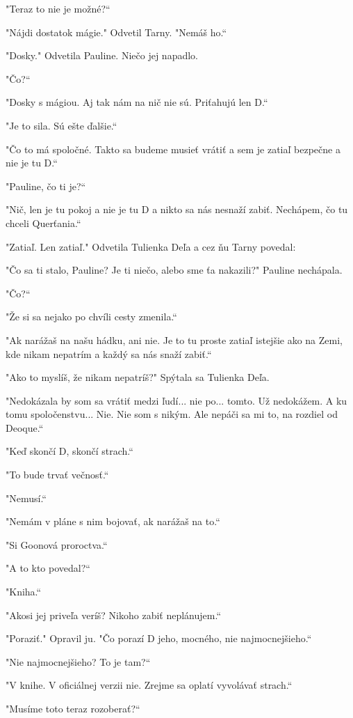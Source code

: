 \documentclass{book}
\begin{document}
"$ $Teraz to nie je možné?“

"$ $Nájdi dostatok mágie."$ $ Odvetil Tarny. "$ $Nemáš ho.“

"$ $Dosky."$ $ Odvetila Pauline. Niečo jej napadlo.

"$ $Čo?“

"$ $Dosky s mágiou. Aj tak nám na nič nie sú. Priťahujú len D.“

"$ $Je to sila. Sú ešte ďalšie.“

"$ $Čo to má spoločné. Takto sa budeme musieť vrátiť a sem je zatiaľ bezpečne a nie je tu D.“

"$ $Pauline, čo ti je?“

"$ $Nič, len je tu pokoj a nie je tu D a nikto sa nás nesnaží zabiť. Nechápem, čo tu chceli Querťania.“

"$ $Zatiaľ. Len zatiaľ."$ $ Odvetila Tulienka Deľa a cez ňu Tarny povedal:

"$ $Čo sa ti stalo, Pauline? Je ti niečo, alebo sme ťa nakazili?"$ $ Pauline nechápala.

"$ $Čo?“

"$ $Že si sa nejako po chvíli cesty zmenila.“

"$ $Ak narážaš na našu hádku, ani nie. Je to tu proste zatiaľ istejšie ako na Zemi, kde nikam nepatrím a každý sa nás snaží zabiť.“

"$ $Ako to myslíš, že nikam nepatríš?"$ $ Spýtala sa Tulienka Deľa.

"$ $Nedokázala by som sa vrátiť medzi ľudí... nie po... tomto. Už nedokážem. A ku tomu spoločenstvu... Nie. Nie som s nikým. Ale nepáči sa mi to, na rozdiel od Deoque.“

"$ $Keď skončí D, skončí strach.“

"$ $To bude trvať večnosť.“

"$ $Nemusí.“

"$ $Nemám v pláne s nim bojovať, ak narážaš na to.“

"$ $Si Goonová proroctva.“

"$ $A to kto povedal?“

"$ $Kniha.“

"$ $Akosi jej priveľa veríš? Nikoho zabiť neplánujem.“

"$ $Poraziť."$ $ Opravil ju. "$ $Čo porazí D jeho, mocného, nie najmocnejšieho.“

"$ $Nie najmocnejšieho? To je tam?“

"$ $V knihe. V oficiálnej verzii nie. Zrejme sa oplatí vyvolávať strach.“

"$ $Musíme toto teraz rozoberať?“
\end{document}
